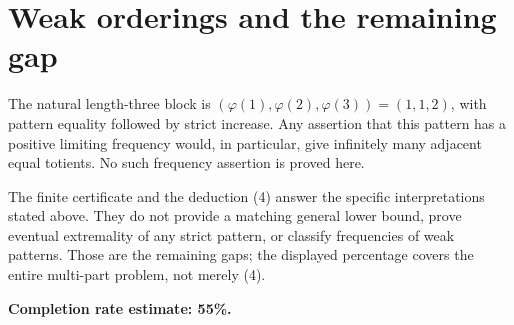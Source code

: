 \documentclass[11pt]{article}
\begin{document}
\section*{Weak orderings and the remaining gap}
The natural length-three block is $(\varphi(1),\varphi(2),\varphi(3))=(1,1,2)$, with pattern equality followed by strict increase. Any assertion that this pattern has a positive limiting frequency would, in particular, give infinitely many adjacent equal totients. No such frequency assertion is proved here.

The finite certificate and the deduction (4) answer the specific interpretations stated above. They do not provide a matching general lower bound, prove eventual extremality of any strict pattern, or classify frequencies of weak patterns. Those are the remaining gaps; the displayed percentage covers the entire multi-part problem, not merely (4).

\textbf{Completion rate estimate: 55\%.}
\end{document}
